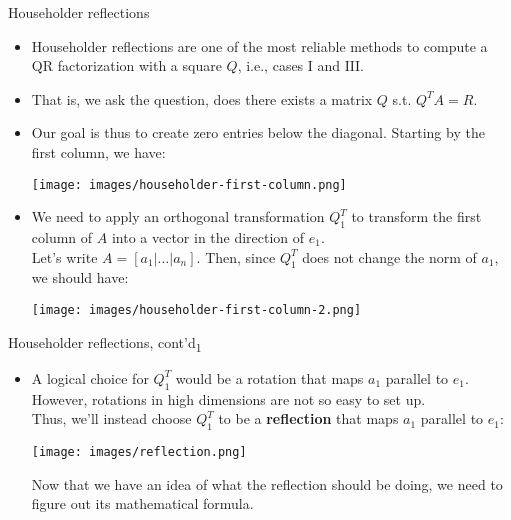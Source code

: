 \documentclass[t,usepdftitle=false]{beamer}
\begin{document}
\begin{frame}{Householder reflections}
\begin{itemize}
\item Householder reflections are one of the most reliable methods to compute a QR factorization with a square $Q$, i.e., cases $\mathrm{I}$ and $\mathrm{III}$.
\item That is, we ask the question, does there exists a matrix $Q$ s.t. $Q^TA=R$.
\item Our goal is thus to create zero entries below the diagonal. 
Starting by the first column, we have:
\begin{center}
\vspace{-.1cm}
\texttt{[image: images/householder-first-column.png]}
\end{center}
\item We need to apply an orthogonal transformation $Q_1^T$ to transform the first column of $A$ into a vector in the direction of $e_1$.\vspace{.1cm}\\
Let's write $A=[a_1|\dots|a_n]$.
Then, since $Q_1^T$ does not change the norm of $a_1$, we should have:
\begin{center}
\vspace{-.1cm}
\texttt{[image: images/householder-first-column-2.png]}
\end{center}
\end{itemize}
\end{frame}

\begin{frame}{Householder reflections, cont'd\textsubscript{1}}
\begin{itemize}
\item A logical choice for $Q_1^T$ would be a rotation that maps $a_1$ parallel to $e_1$.\vspace{.1cm}\\
However, rotations in high dimensions are not so easy to set up.\vspace{.1cm}\\
Thus, we'll instead choose $Q_1^T$ to be a \textbf{reflection} that maps $a_1$ parallel to $e_1$:
\begin{center}
\vspace{.1cm}
\texttt{[image: images/reflection.png]}
\end{center}
\vspace{.2cm}
Now that we have an idea of what the reflection should be doing, we need to figure out its mathematical formula.
\end{itemize}
\end{frame}
\end{document}
